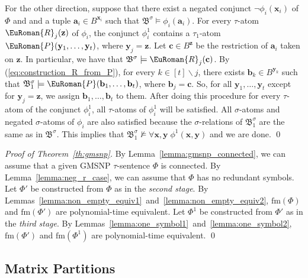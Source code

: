 \documentclass[10pt,a4paper]{amsart}
\theoremstyle{plain}
\theoremstyle{definition}
\numberwithin{equation}{section}
\renewcommand{\proof}[1][Proof]{\par\noindent\textit{#1.}\enspace\ignorespaces}
\newcommand{\eurm}[1]{\EuRoman{#1}} %
\newcommand{\structure}[1]{\mathfrak{#1}} %
\newcommand{\tuple}[1]{\mathbf{#1}} %
\newcommand{\rel}[1]{\eurm{#1}} %
\newcommand{\Sat}[0]{\ensuremath{\mathrm{fm}}}
\renewcommand{\setminus}{\smallsetminus}
\begin{document}
For the other direction, suppose that there exist a negated conjunct $\neg\phi_i(\tuple{x}_i)$ of $\Phi$ and and a tuple $\tuple{a}_i\in B^{\tuple{x}_i}$ such that $\structure{B}^\sigma\models\phi_i (\tuple{a}_i)$.
For every $\tau$-atom $\rel{R}_j(\tuple{z})$ of $\phi_i$, the conjunct $\phi_i^1$ contains a $\tau_1$-atom $\rel{P}(\tuple{y}_1,\ldots,\tuple{y}_t)$, where $\tuple{y}_j=\tuple{z}$.
Let $\tuple{c}\in B^{\tuple{z}}$ be the restriction of $\tuple{a}_i$ taken on $\tuple{z}$.
In particular, we have that $\structure{B}^\sigma\models\rel{R}_j(\tuple{c})$.
By (\ref{eq:construction_R_from_P}), for every $k\in[t]\setminus j$, there exists $\tuple{b}_k\in B^{\tuple{y}_k}$ such that $\structure{B}_1^\sigma\models\rel{P}(\tuple{b}_1,\ldots,\tuple{b}_t)$, where $\tuple{b}_j=\tuple{c}$.
So, for all $\tuple{y}_1,\ldots,\tuple{y}_t$ except for $\tuple{y}_j=\tuple{z}$, we assign $\tuple{b}_1,\ldots,\tuple{b}_t$ to them.
After doing this procedure for every $\tau$-atom of the conjunct $\phi_i^1$, all $\tau$-atoms of $\phi_i^1$ will be satisfied.
All $\sigma$-atoms and negated $\sigma$-atoms of $\phi_i$ are also satisfied because the $\sigma$-relations of $\structure{B}_1^\sigma$ are the same as in $\structure{B}^\sigma$.
This implies that $\structure{B}_1^\sigma\not\models\forall\tuple{x},\tuple{y}\;\phi^1(\tuple{x},\tuple{y})$ and we are done.
\qed


\proof[Proof of Theorem~\ref{th:gmsnp}]
By Lemma~\ref{lemma:gmsnp_connected}, we can assume that a given GMSNP $\tau$-sentence $\Phi$ is connected.
%
By Lemma~\ref{lemma:neg_r_case}, we can assume that $\Phi$ has no redundant symbols.
%
Let $\Phi'$ be constructed from $\Phi$ as in the \emph{second stage}.
%
By Lemmas~\ref{lemma:non_empty_equiv1}~and~\ref{lemma:non_empty_equiv2}, $\Sat(\Phi)$ and $\Sat(\Phi')$ are polynomial-time equivalent.
%
Let $\Phi^1$ be constructed from $\Phi'$ as in the \emph{third stage}.
%
By Lemmas~\ref{lemma:one_symbol1}~and~\ref{lemma:one_symbol2}, $\Sat(\Phi')$ and $\Sat(\Phi^1)$ are polynomial-time equivalent.
\qed
















\subsection{Matrix Partitions}\label{section:mp}
\end{document}
